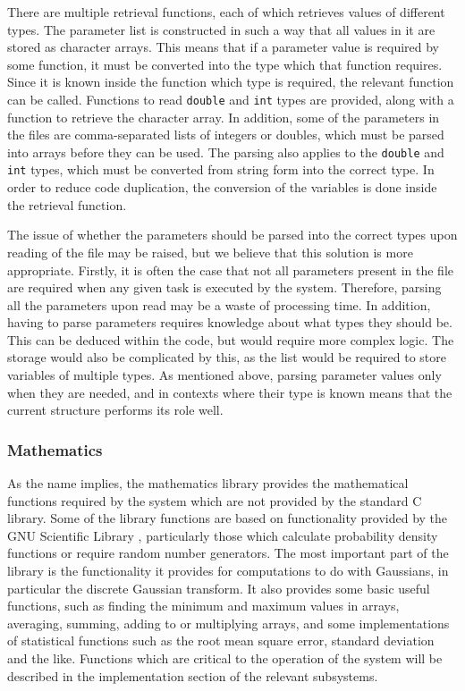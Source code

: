 \documentclass[a4paper,11pt]{article}
\begin{document}
    There are multiple retrieval functions, each of which retrieves values of
    different types. The parameter list is constructed in such a way that all
    values in it are stored as character arrays. This means that if a parameter
    value is required by some function, it must be converted into the type which
    that function requires. Since it is known inside the function which type is
    required, the relevant function can be called. Functions to read
    \texttt{double} and \texttt{int} types are provided, along with a function
    to retrieve the character array. In addition, some of the parameters in the
    files are comma-separated lists of integers or doubles, which must be parsed
    into arrays before they can be used. The parsing also applies to the
    \texttt{double} and \texttt{int} types, which must be converted from string
    form into the correct type. In order to reduce code duplication, the
    conversion of the variables is done inside the retrieval function.

    The issue of whether the parameters should be parsed into the correct types
    upon reading of the file may be raised, but we believe that this solution is
    more appropriate. Firstly, it is often the case that not all parameters
    present in the file are required when any given task is executed by the
    system. Therefore, parsing all the parameters upon read may be a waste of
    processing time. In addition, having to parse parameters requires knowledge
    about what types they should be. This can be deduced within the code, but
    would require more complex logic. The storage would also be complicated by
    this, as the list would be required to store variables of multiple types. As
    mentioned above, parsing parameter values only when they are needed, and in
    contexts where their type is known means that the current structure performs
    its role well.
\subsubsection{Mathematics}
\label{sec-3-4-2}

    As the name implies, the mathematics library provides the mathematical
    functions required by the system which are not provided by the standard C
    library. Some of the library functions are based on functionality provided
    by the GNU Scientific Library \cite{gsl}, particularly those which calculate
    probability density functions or require random number generators. The most
    important part of the library is the functionality it provides for
    computations to do with Gaussians, in particular the discrete Gaussian
    transform. It also provides some basic useful functions, such as finding the
    minimum and maximum values in arrays, averaging, summing, adding to or
    multiplying arrays, and some implementations of statistical functions such
    as the root mean square error, standard deviation and the like. Functions
    which are critical to the operation of the system will be described in the
    implementation section of the relevant subsystems.
\end{document}
